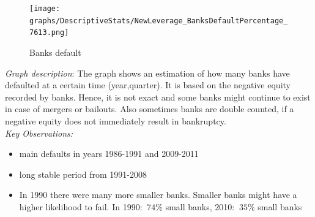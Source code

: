 \documentclass[12pt, a4paper]{article} %
\begin{document}

\newpage

\iffalse

\begin{figure}[hbtp]
\centering
\caption{Banks default}
\texttt{[image: graphs/DescriptiveStats/NewLeverage\_BanksDefaultPercentage\_7613.png]}
\end{figure}

\noindent \textit{Graph description}: The graph shows an estimation of how many banks have defaulted at a certain time (year,quarter). It is based on the negative equity recorded by banks. Hence, it is not exact and some banks might continue to exist in case of mergers or bailouts. Also sometimes banks are double counted, if a negative equity does not immediately result in bankruptcy. \\
\noindent \textit{Key Observations:}
\begin{itemize}
\item main defaults in years 1986-1991 and 2009-2011
\item long stable period from 1991-2008
\item In 1990 there were many more smaller banks. Smaller banks might have a higher likelihood to fail. In 1990:  $~74\%$ small banks, 2010: $~35\%$ small banks 
\end{itemize}
\end{document}
